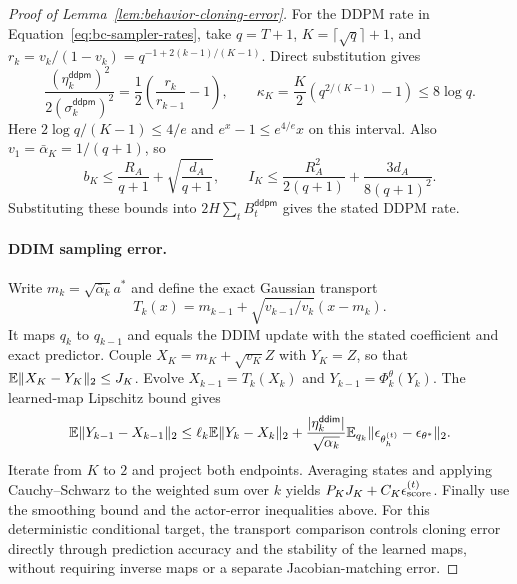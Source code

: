 \begin{proof}[Proof of Lemma~\ref{lem:behavior-cloning-error}]
For the DDPM rate in Equation~\ref{eq:bc-sampler-rates}, take $q=T+1$, $K=\lceil\sqrt q\rceil+1$, and $r_k=v_k/(1-v_k)=q^{-1+2(k-1)/(K-1)}$. Direct substitution gives
\[
 \frac{(\eta_k^{\mathsf{ddpm}})^2}{2(\sigma_k^{\mathsf{ddpm}})^2}
 =\frac12\left(\frac{r_k}{r_{k-1}}-1\right),\qquad
 \kappa_K=\frac K2\left(q^{2/(K-1)}-1\right)\le8\log q.
\]
Here $2\log q/(K-1)\le4/e$ and $e^x-1\le e^{4/e}x$ on this interval. Also $v_1=\bar\alpha_K=1/(q+1)$, so
\[
 b_K\le\frac{R_A}{q+1}+\sqrt{\frac{d_A}{q+1}},\qquad
 I_K\le\frac{R_A^2}{2(q+1)}+\frac{3d_A}{8(q+1)^2}.
\]
Substituting these bounds into $2H\sum_t B_t^{\mathsf{ddpm}}$ gives the stated DDPM rate.

\paragraph{DDIM sampling error.}
Write $m_k=\sqrt{\bar\alpha_k}a^*$ and define the exact Gaussian transport
\[
 T_k(x)=m_{k-1}+\sqrt{v_{k-1}/v_k}(x-m_k).
\]
It maps $q_k$ to $q_{k-1}$ and equals the DDIM update with the stated coefficient and exact predictor. Couple $X_K=m_K+\sqrt{v_K}Z$ with $Y_K=Z$, so that $\mathbb{E}\|X_K-Y_K\|_2\le J_K$. Evolve $X_{k-1}=T_k(X_k)$ and $Y_{k-1}=\Phi_k^\theta(Y_k)$. The learned-map Lipschitz bound gives
\[
 \mathbb{E}\|Y_{k-1}-X_{k-1}\|_2\le\ell_k\mathbb{E}\|Y_k-X_k\|_2+
 \frac{|\eta_k^{\mathsf{ddim}}|}{\sqrt{\alpha_k}}
 \mathbb{E}_{q_k}\|\epsilon_{\theta_h^{(t)}}-\epsilon_{\theta^*}\|_2.
\]
Iterate from $K$ to $2$ and project both endpoints. Averaging states and applying Cauchy--Schwarz to the weighted sum over $k$ yields $P_KJ_K+C_K\epsilon_{\text{score}}^{(t)}$. Finally use the smoothing bound and the actor-error inequalities above. For this deterministic conditional target, the transport comparison controls cloning error directly through prediction accuracy and the stability of the learned maps, without requiring inverse maps or a separate Jacobian-matching error.


\end{proof}
